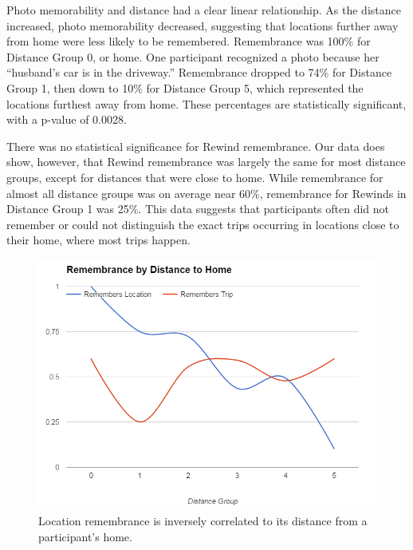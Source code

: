 \documentclass{sigchi}
\begin{document}
Photo memorability and distance had a clear linear relationship. As the distance increased, photo memorability decreased, suggesting that locations further away from home were less likely to be remembered. Remembrance was 100\% for Distance Group 0, or home. One participant recognized a photo because her ``husband's car is in the driveway.'' Remembrance dropped to 74\% for Distance Group 1, then down to 10\% for Distance Group 5, which represented the locations furthest away from home. These percentages are statistically significant, with a p-value of 0.0028. 

There was no statistical significance for Rewind remembrance. Our data does show, however, that Rewind remembrance was largely the same for most distance groups, except for distances that were close to home. While remembrance for almost all distance groups was on average near 60\%, remembrance for Rewinds in Distance Group 1 was 25\%. This data suggests that participants often did not remember or could not distinguish the exact trips occurring in locations close to their home, where most trips happen.  

\begin{figure}
	\centering
	\includegraphics[width=1\linewidth]{distance}
	\caption{Location remembrance is inversely correlated to its distance from a participant's home.}
	\label{fig:distancememory}
\end{figure}
\end{document}

